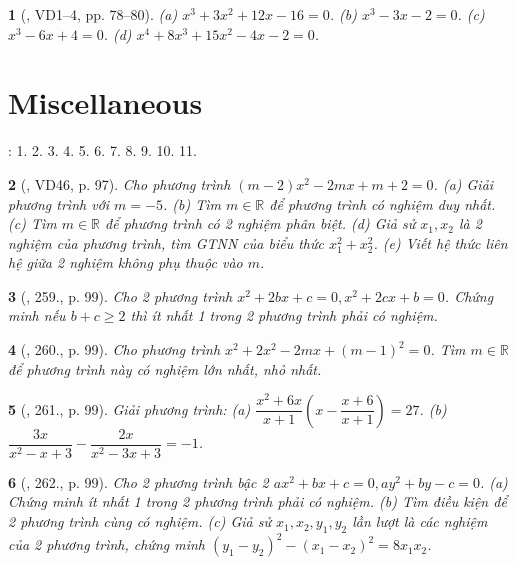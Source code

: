 \documentclass{article}
\newtheorem{baitoan}{}
\begin{document}
\begin{baitoan}[\cite{Binh_Toan_9_tap_2}, VD1--4, pp. 78--80]
	(a) $x^3 + 3x^2 + 12x - 16 = 0$. (b) $x^3 - 3x - 2 = 0$. (c) $x^3 - 6x + 4 = 0$. (d) $x^4 + 8x^3 + 15x^2 - 4x - 2 = 0$.
\end{baitoan}


\section{Miscellaneous}
\cite[BTCCVII, \S3, pp. 66--67]{SGK_Toan_9_Canh_Dieu_tap_2}: 1. 2. 3. 4. 5. 6. 7. 8. 9. 10. 11.

\begin{baitoan}[\cite{Tuyen_Toan_9_old}, VD46, p. 97]
	Cho phương trình $(m - 2)x^2 - 2mx + m + 2 = 0$. (a) Giải phương trình với $m = -5$. (b) Tìm $m\in\mathbb{R}$ để phương trình có nghiệm duy nhất. (c) Tìm $m\in\mathbb{R}$ để phương trình có 2 nghiệm phân biệt. (d) Giả sử $x_1,x_2$ là 2 nghiệm của phương trình, tìm {\rm GTNN} của biểu thức $x_1^2 + x_2^2$. (e) Viết hệ thức liên hệ giữa 2 nghiệm không phụ thuộc vào $m$.
\end{baitoan}

\begin{baitoan}[\cite{Tuyen_Toan_9_old}, 259., p. 99]
	Cho 2 phương trình $x^2 + 2bx + c = 0,x^2 + 2cx + b = 0$. Chứng minh nếu $b + c\ge2$ thì ít nhất 1 trong 2 phương trình phải có nghiệm.
\end{baitoan}

\begin{baitoan}[\cite{Tuyen_Toan_9_old}, 260., p. 99]
	Cho phương trình $x^2 + 2x^2 - 2mx + (m - 1)^2 = 0$. Tìm $m\in\mathbb{R}$ để phương trình này có nghiệm lớn nhất, nhỏ nhất.
\end{baitoan}

\begin{baitoan}[\cite{Tuyen_Toan_9_old}, 261., p. 99]
	Giải phương trình: (a) $\dfrac{x^2 + 6x}{x + 1}\left(x - \dfrac{x + 6}{x + 1}\right) = 27$. (b) $\dfrac{3x}{x^2 - x + 3} - \dfrac{2x}{x^2 - 3x + 3} = -1$.
\end{baitoan}

\begin{baitoan}[\cite{Tuyen_Toan_9_old}, 262., p. 99]
	Cho 2 phương trình bậc 2 $ax^2 + bx + c = 0,ay^2 + by - c = 0$. (a) Chứng minh ít nhất 1 trong 2 phương trình phải có nghiệm. (b) Tìm điều kiện để 2 phương trình cùng có nghiệm. (c) Giả sử $x_1,x_2,y_1,y_2$ lần lượt là các nghiệm của 2 phương trình, chứng minh $(y_1 - y_2)^2 - (x_1 - x_2)^2 = 8x_1x_2$.
\end{baitoan}
\end{document}
